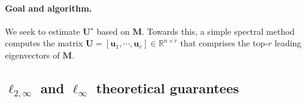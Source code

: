 \paragraph{Goal and algorithm.}
We seek to estimate $\bm{U}^{\star}$ based on $\bm{M}$. Towards this, a simple spectral  method computes the matrix $\bm{U}=[\bm{u}_1,\cdots,\bm{u}_r]\in \mathbb{R}^{n\times r}$ that comprises the top-$r$ leading eigenvectors of $\bm{M}$.






\subsection{$\ell_{2,\infty}$ and $\ell_{\infty}$ theoretical guarantees}
\label{sec:L2inf-Linf-eigen-theory}


